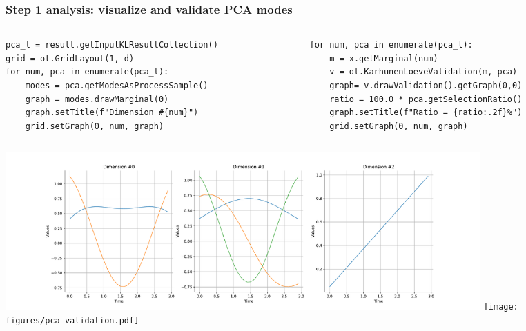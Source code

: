 \documentclass{beamer}
\begin{document}
\begin{frame}[containsverbatim]
\frametitle{Step 1 analysis: visualize and validate PCA modes}
\vspace{-0.3cm}
\begin{columns}
  \begin{column}{0.49\textwidth}
  \begin{lstlisting}
pca_l = result.getInputKLResultCollection()
grid = ot.GridLayout(1, d)
for num, pca in enumerate(pca_l):
    modes = pca.getModesAsProcessSample()
    graph = modes.drawMarginal(0)
    graph.setTitle(f"Dimension #{num}")
    grid.setGraph(0, num, graph)
  \end{lstlisting}    
  \end{column}
  \begin{column}{0.49\textwidth}
    \begin{lstlisting}
for num, pca in enumerate(pca_l):
    m = x.getMarginal(num)
    v = ot.KarhunenLoeveValidation(m, pca)
    graph= v.drawValidation().getGraph(0,0)
    ratio = 100.0 * pca.getSelectionRatio()
    graph.setTitle(f"Ratio = {ratio:.2f}%")
    grid.setGraph(0, num, graph)
    \end{lstlisting}    
    \end{column}  
\end{columns}

\vspace{-0.4cm}
\centering
\includegraphics[width=0.8\textwidth]{figures/pca_modes.pdf}
\texttt{[image: figures/pca\_validation.pdf]}

\end{frame}
  
  
  
  
\end{document}
